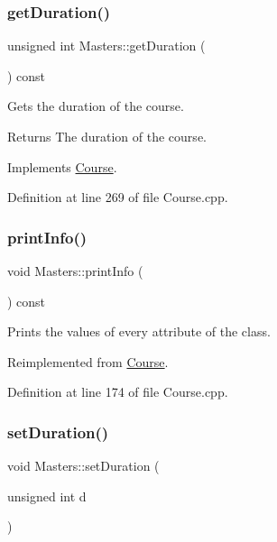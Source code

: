 \subsubsection{\texorpdfstring{get\+Duration()}{getDuration()}}
{\footnotesize\ttfamily unsigned int Masters\+::get\+Duration (\begin{DoxyParamCaption}{ }\end{DoxyParamCaption}) const\hspace{0.3cm}{\ttfamily [virtual]}}

Gets the duration of the course. \begin{DoxyReturn}{Returns}
The duration of the course. 
\end{DoxyReturn}


Implements \hyperlink{classCourse}{Course}.



Definition at line 269 of file Course.\+cpp.

\mbox{\label{classMasters_a72034d4ad86c3d62c755ad04228d09da}} 
\subsubsection{\texorpdfstring{print\+Info()}{printInfo()}}
{\footnotesize\ttfamily void Masters\+::print\+Info (\begin{DoxyParamCaption}{ }\end{DoxyParamCaption}) const\hspace{0.3cm}{\ttfamily [virtual]}}

Prints the values of every attribute of the class. 

Reimplemented from \hyperlink{classCourse_a3248ecd5df196cf50ce379ec37758c59}{Course}.



Definition at line 174 of file Course.\+cpp.

\mbox{\label{classMasters_af80b6665ac5a0f5fb189da1fd636b0fb}} 
\subsubsection{\texorpdfstring{set\+Duration()}{setDuration()}}
{\footnotesize\ttfamily void Masters\+::set\+Duration (\begin{DoxyParamCaption}\item[{unsigned int}]{d }\end{DoxyParamCaption})\hspace{0.3cm}{\ttfamily [virtual]}}

